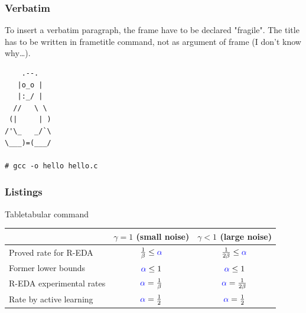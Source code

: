 \begin{frame}[fragile]
    \frametitle{Verbatim}  %
    To insert a verbatim paragraph, the frame have to be declared "fragile".
    The title has to be written in frametitle command, not as argument of frame (I don't know why\dots).

\begin{verbatim}
    .--.
   |o_o |
   |:_/ |
  //   \ \
 (|     | )
/'\_   _/`\
\___)=(___/

# gcc -o hello hello.c
\end{verbatim}

\end{frame}
\note{
}


\begin{frame}[allowframebreaks]  %
    \frametitle{Listings}  %
    \begin{small}
        
    \end{small}
\end{frame}
\note{
}


\begin{frame}{Table}{tabular command}
    \begin{small}
        \begin{tabular}{|l|c|c|}
        \hline
                                  & $\gamma=1$ (small noise)                      & $\gamma<1$ (large noise) \\
        \hline
        Proved rate for R-EDA     & $\frac{1}{\beta} \leq {\color{blue} \alpha}$  & $\frac{1}{2\beta} \leq {\color{blue} \alpha}$ \\
        \hline
        Former lower bounds       & ${\color{blue} \alpha} \leq 1$                & ${\color{blue} \alpha} \leq 1$ \\
        \hline
        R-EDA experimental rates  & ${\color{blue} \alpha} = \frac{1}{\beta}$     & ${\color{blue} \alpha} = \frac{1}{2\beta}$ \\
        \hline
        \hline
        Rate by active learning   & ${\color{blue} \alpha} = \frac{1}{2}$        & ${\color{blue} \alpha} = \frac{1}{2}$   \\
        \hline
        \end{tabular}
    \end{small}
\end{frame}
\note{
}


